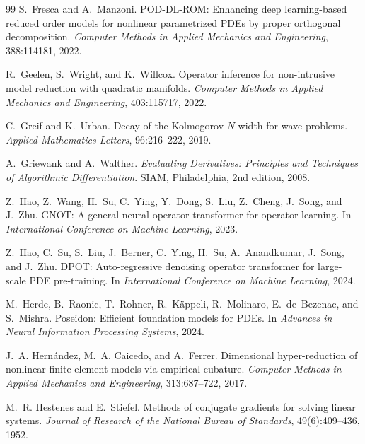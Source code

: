 \documentclass{article}
\begin{document}
\begin{thebibliography}{99}
S.~Fresca and A.~Manzoni.
\newblock POD-DL-ROM: Enhancing deep learning-based reduced order
models for nonlinear parametrized PDEs by proper orthogonal decomposition.
\newblock \emph{Computer Methods in Applied Mechanics and Engineering},
388:114181, 2022.

R.~Geelen, S.~Wright, and K.~Willcox.
\newblock Operator inference for non-intrusive model reduction with
quadratic manifolds.
\newblock \emph{Computer Methods in Applied Mechanics and Engineering},
403:115717, 2022.

C.~Greif and K.~Urban.
\newblock Decay of the Kolmogorov $N$-width for wave problems.
\newblock \emph{Applied Mathematics Letters}, 96:216--222, 2019.

A.~Griewank and A.~Walther.
\newblock \emph{Evaluating Derivatives: Principles and Techniques of
Algorithmic Differentiation}.
\newblock SIAM, Philadelphia, 2nd edition, 2008.

Z.~Hao, Z.~Wang, H.~Su, C.~Ying, Y.~Dong, S.~Liu, Z.~Cheng, J.~Song,
and J.~Zhu.
\newblock GNOT: A general neural operator transformer for operator
learning.
\newblock In \emph{International Conference on Machine Learning}, 2023.

Z.~Hao, C.~Su, S.~Liu, J.~Berner, C.~Ying, H.~Su, A.~Anandkumar,
J.~Song, and J.~Zhu.
\newblock DPOT: Auto-regressive denoising operator transformer for
large-scale PDE pre-training.
\newblock In \emph{International Conference on Machine Learning}, 2024.

M.~Herde, B.~Raonic, T.~Rohner, R.~K\"appeli, R.~Molinaro,
E.~de~Bezenac, and S.~Mishra.
\newblock Poseidon: Efficient foundation models for PDEs.
\newblock In \emph{Advances in Neural Information Processing Systems},
2024.

J.~A. Hern\'andez, M.~A. Caicedo, and A.~Ferrer.
\newblock Dimensional hyper-reduction of nonlinear finite element
models via empirical cubature.
\newblock \emph{Computer Methods in Applied Mechanics and Engineering},
313:687--722, 2017.

M.~R. Hestenes and E.~Stiefel.
\newblock Methods of conjugate gradients for solving linear systems.
\newblock \emph{Journal of Research of the National Bureau of Standards},
49(6):409--436, 1952.


\end{thebibliography}
\end{document}
